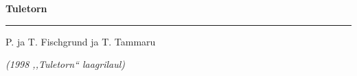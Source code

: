\documentclass[12pt]{extbook}
\begin{document}
{
  \samepage
  \raggedbottom
  \raggedright
  \sloppy


  \vspace{0.2in}
    \centerline{
      \bfseries
      \large Tuletorn
    }
  \nopagebreak[4]
  \vspace{0.1in}
  \nopagebreak[4]
  \hrule height 0.05ex
  \nopagebreak[4]
  \vspace{-0.05in}

  {\footnotesize  \hfill P. ja T. Fischgrund ja T. Tammaru }\\
  \vspace{0.01in}

  {\em {\footnotesize (1998 ,,Tuletorn{``} laagrilaul) } }
  \vspace{0.01in}


}
\end{document}
